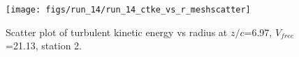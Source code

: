 \begin{figure}[H]
\centering
\texttt{[image: figs/run\_14/run\_14\_ctke\_vs\_r\_meshscatter]}
\caption{Scatter plot of turbulent kinetic energy vs radius at $z/c$=6.97, $V_{free}$=21.13, station 2.}
\label{fig:run_14_ctke_vs_r_meshscatter}
\end{figure}


